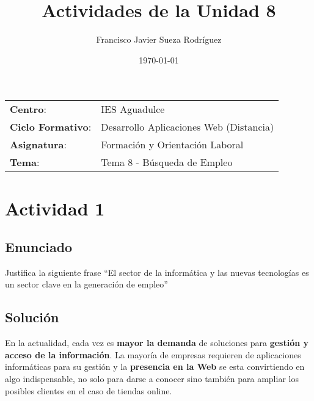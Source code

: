 


\title{
\normalfont \normalsize
\huge \textbf{Actividades de la Unidad 8}
}
\author{Francisco Javier Sueza Rodríguez}
\date{\normalsize\today}



\maketitle

\vspace{2ex}

\begin{center}
    \begin{tabular}{l l}
        \textbf{Centro}: & IES Aguadulce \\
        \textbf{Ciclo Formativo}: & Desarrollo Aplicaciones Web (Distancia)\\
        \textbf{Asignatura}: & Formación y Orientación Laboral\\
        \textbf{Tema}: & Tema 8 - Búsqueda de Empleo \\
    \end{tabular}
\end{center}

\vspace{10ex}

\section{Actividad 1}
\subsection{Enunciado}
Justifica la siguiente frase ``El sector de la informática y las nuevas tecnologías es un sector clave en la generación de empleo''

\subsection{Solución}
En la actualidad, cada vez es \textbf{mayor la demanda} de soluciones para \textbf{gestión y acceso de la información}. La mayoría de empresas requieren de aplicaciones informáticas para su gestión y la \textbf{presencia en la Web} se esta convirtiendo en algo indispensable, no solo para darse a conocer sino también para ampliar los posibles clientes en el caso de tiendas online.

